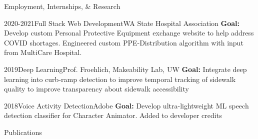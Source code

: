 \documentclass[]{mcdowellcv}
\begin{document}
\begin{cvsection}{Employment, Internships, \& Research}
	\begin{cvsubsection}{2020-2021}{Full Stack Web Development}{WA State Hospital Association}
		\textbf{Goal:} Develop custom Personal Protective Equipment exchange website to help address COVID shortages. Engineered custom PPE-Distribution algorithm with input from  MultiCare Hospital.
	\end{cvsubsection}

	\begin{cvsubsection}{2019}{Deep Learning}{Prof. Froehlich, Makeability Lab, UW}
		\textbf{Goal:} Integrate deep learning into curb-ramp detection to improve temporal tracking of sidewalk quality to improve transparency about sidewalk accessibility
	\end{cvsubsection}

	\begin{cvsubsection}{2018}{Voice Activity Detection}{Adobe}
		\textbf{Goal:} Develop ultra-lightweight ML speech detection classifier for Character Animator. Added to developer credits
	\end{cvsubsection}
\end{cvsection}

\begin{cvsection}{Publications}



	

\end{cvsection}
\end{document}
